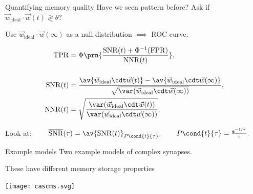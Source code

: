 \documentclass{beamer}%
\newcommand{\inv}{^{-1}}
\newcommand{\syn}{\vec{w}}
\newcommand{\synid}{\syn_\text{ideal}}
\DeclareMathOperator{\snr}{SNR}
\newcommand{\snrb}{\overline{\snr}}
\renewcommand{\e}{\mathsf{e}}
\begin{document}

\begin{frame}{Quantifying memory quality}
%
 Have we seen pattern before?
 Ask if $\synid \cdot \syn(t) \gtrless \theta$?
 
 Use $\synid \cdot \syn(\infty)$ as a null distribution
 $\implies$ ROC curve:
 
 \vp
 \parbox[t]{0.4\linewidth}{%
 }
 \parbox[t]{0.55\linewidth}{%
 \vspace{-\baselineskip}
 \begin{equation*}
   \begin{aligned}
   \operatorname{TPR} &= \Phi \prn{ \frac{ \snr(t) +\Phi\inv(\operatorname{FPR}) }{ \operatorname{NNR}(t) } }, \\[0.5cm]
     \snr(t) &= \frac{ \av{\synid\cdt\syn(t)} - \av{\synid\cdt\syn(\infty)} }{ \sqrt{\var(\synid\cdt\syn(\infty))}}, \\
     \operatorname{NNR}(t) &= \sqrt{\frac{ \var(\synid\cdt\syn(t)) }{ \var(\synid\cdt\syn(\infty)) }}.
   \end{aligned}
 \end{equation*}
 }
 
 \vp
 Look at:
 $
   \qquad
   \snrb(\tau) = \av{\snr(t)}_{P\cond{t}{\tau}},
   \qquad
   P\cond{t}{\tau} = \frac{\e^{-t/\tau}}{\tau}.
 $
%
%
\end{frame}


\begin{frame}{Example models}
%
 Two example models of complex synapses.
 \begin{center}
  \hspace{2cm}
 \end{center}

 These have different memory storage properties
 \begin{center}
 \texttt{[image: cascms.svg]}
 \end{center}
%
\end{frame}
\end{document}
